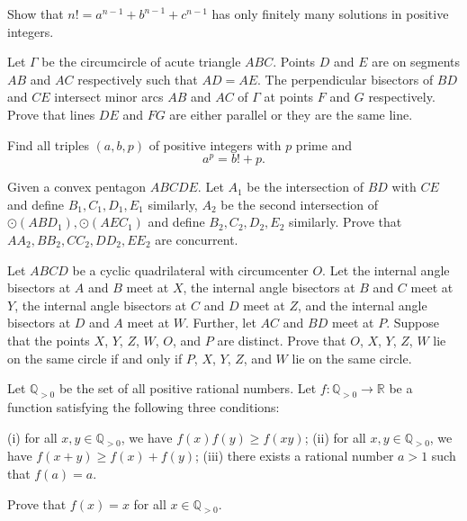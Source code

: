 \documentclass[11pt]{scrartcl}
\begin{document}
\begin{problem}[599825051147866097]
Show that $n!=a^{n-1}+b^{n-1}+c^{n-1}$ has only finitely many solutions in positive integers.
\end{problem}
\begin{problem}[625002281186392279]
	Let $\Gamma$ be the circumcircle of acute triangle $ABC$. Points $D$ and $E$ are on segments $AB$ and $AC$ respectively such that $AD = AE$. The perpendicular bisectors of $BD$ and $CE$ intersect minor arcs $AB$ and $AC$ of $\Gamma$ at points $F$ and $G$ respectively. Prove that lines $DE$ and $FG$ are either parallel or they are the same line.
\end{problem}
\begin{problem}[627600286851318227]
Find all triples $(a,b,p)$ of positive integers with $p$ prime and\[ a^p=b!+p. \]
\end{problem}
\begin{problem}[651308339506337942]
Given a convex pentagon $ ABCDE. $ Let $ A_1 $ be the intersection of $ BD $ with $ CE $ and define $ B_1, C_1, D_1, E_1 $ similarly, $ A_2 $ be the second intersection of $ \odot (ABD_1),\odot (AEC_1) $ and define $ B_2, C_2, D_2, E_2 $ similarly. Prove that $ AA_2, BB_2, CC_2, DD_2, EE_2 $ are concurrent.
\end{problem}
\begin{problem}[653910026918142375]
Let $ABCD$ be a cyclic quadrilateral with circumcenter $O$. Let the internal angle bisectors at $A$ and $B$ meet at $X$, the internal angle bisectors at $B$ and $C$ meet at $Y$, the internal angle bisectors at $C$ and $D$ meet at $Z$, and the internal angle bisectors at $D$ and $A$ meet at $W$. Further, let $AC$ and $BD$ meet at $P$. Suppose that the points $X$, $Y$, $Z$, $W$, $O$, and $P$ are distinct.
Prove that $O$, $X$, $Y$, $Z$, $W$ lie on the same circle if and only if $P$, $X$, $Y$, $Z$, and $W$ lie on the same circle.
\end{problem}
\begin{problem}[658315898528816725]
	Let $\mathbb Q_{>0}$ be the set of all positive rational numbers. Let $f:\mathbb Q_{>0}\to\mathbb R$ be a function satisfying the following three conditions:

(i) for all $x,y\in\mathbb Q_{>0}$, we have $f(x)f(y)\geq f(xy)$;
(ii) for all $x,y\in\mathbb Q_{>0}$, we have $f(x+y)\geq f(x)+f(y)$;
(iii) there exists a rational number $a>1$ such that $f(a)=a$.

Prove that $f(x)=x$ for all $x\in\mathbb Q_{>0}$.
\end{problem}
\end{document}
